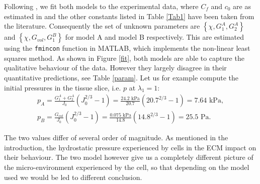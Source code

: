 Following \cite{ecm2}, we fit both models to the experimental data, where $C_f$ and $c_0$ are as estimated in \cite{Netti} and the other constants listed in Table \ref{Tab1} have been taken from the literature. Consequently the set of unknown parameters are $\left\{\chi, G^A_1, G^A_2\right\}$ and  $\left\{\chi, G_{vol}, G^B_1\right\}$ for model A and model B respectively. This are estimated using the \texttt{fmincon} function in MATLAB, which implements the non-linear least squares method. As shown in Figure \ref{fit}, both models are able to capture the qualitative behaviour of the data. However they largely disagree in their quantitative predictions, see Table \ref{param}. Let us for example compute the initial pressures in the tissue slice, i.e. $p$ at $\lambda_1=1$:  
\begin{gather}
p_A = \frac{G^A_1+G^A_2}{J_0}(J_0^{2/3}-1) = \frac{24.2 \text{ kPa}}{20.7}(20.7^{2/3}-1) = 7.64 \text{ kPa},\\
p_B = \frac{G_{vol}}{J_0}(J_0^{2/3}-1) = \frac{0.075 \text{ kPa}}{14.8}(14.8^{2/3}-1) = 25.5 \text{ Pa}.
\end{gather}

The two values differ of several order of magnitude. As mentioned in the introduction, the hydrostatic pressure experienced by cells in the ECM impact on their behaviour. The two model however give us a completely different picture of the micro-environment experienced by the cell, so that depending on the model used we would be led to different conclusion. 

